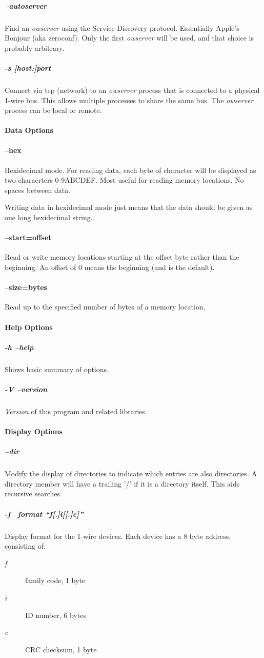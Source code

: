 \subparagraph*{--autoserver}Find
an  \textit{owserver} using the Service Discovery protocol. Essentially Apple's Bonjour
(aka zeroconf). Only the first  \textit{owserver}  will be used, and that choice
is probably arbitrary. 
\subparagraph*{-s [host:]port}Connect via tcp (network) to an \textit{owserver}
process that is connected to a physical 1-wire bus. This allows multiple
processes to share the same bus. The \textit{owserver} process can be local or remote.

\paragraph*{Data Options}

\paragraph*{--hex}
Hexidecimal mode. For reading data, each byte of character
will be displayed as two characrters 0-9ABCDEF. Most useful for reading memory
locations. No spaces between data. 

Writing data in hexidecimal mode just
means that the data should be given as one long hexidecimal string. 
\paragraph*{--start=offset}
Read
or write memory locations starting at the offset byte rather than the beginning.
An offset of 0 means the beginning (and is the default). 


\paragraph*{--size=bytes}
Read
up to the specified number of bytes of a memory location. 
\paragraph*{Help Options}

\subparagraph*{-h
--help}Shows basic summary of options. 
\subparagraph*{-V --version}\textit{Version} of this program and
related libraries. 
\paragraph*{Display Options}

\subparagraph*{--dir}Modify the display of directories to
indicate which entries are also directories. A directory member will have
a trailing '/' if it is a directory itself. This aids recursive searches. 
\subparagraph*{-f
--format ``f[.]i[[.]c]''}Display format for the 1-wire devices. Each device has
a 8 byte address, consisting of: \begin{description}
\item [\textit{f} ] family code, 1 byte 
\item [\textit{i} ] ID number, 6 bytes

\item [\textit{c} ] CRC checksum, 1 byte 
\end{description}


